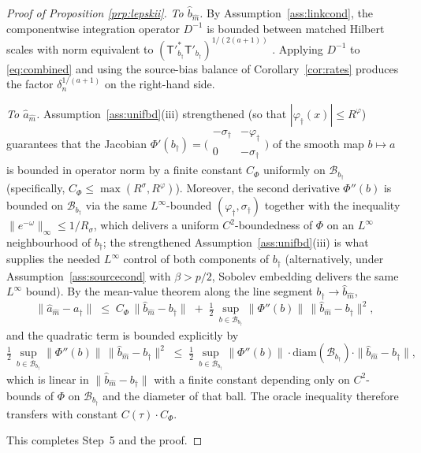 \begin{proof}[Proof of Proposition \ref{prp:lepskii}]
\emph{To $\hat b_{\hat m}$.} By Assumption~\ref{ass:linkcond}, the
componentwise integration operator $D^{-1}$ is bounded between matched
Hilbert scales with norm equivalent to
$(\mathsf{T}'^{*}_{b_\dagger}\mathsf{T}'_{b_\dagger})^{1/(2(a+1))}$
\citep{florens2012}. %
Applying $D^{-1}$ to \eqref{eq:combined} and using the source-bias balance of
Corollary~\ref{cor:rates} produces the factor $\delta_n^{1/(a+1)}$ on the
right-hand side.

\emph{To $\hat a_{\hat m}$.} Assumption~\ref{ass:unifbd}\textup{(iii)}
strengthened (so that $|\varphi_\dagger(x)| \le R^\varphi$) %
guarantees that the Jacobian
\(
\Phi'(b_\dagger) = \bigl(\begin{smallmatrix}-\sigma_\dagger & -\varphi_\dagger \\ 0 & -\sigma_\dagger\end{smallmatrix}\bigr)
\)
of the smooth map $b \mapsto a$ is bounded in operator norm by a finite
constant $C_\Phi$ uniformly on $\mathcal{B}_{b_\dagger}$ (specifically,
$C_\Phi \le \max(R^\sigma, R^\varphi)$). Moreover, the second derivative
$\Phi''(b)$ is bounded on $\mathcal{B}_{b_\dagger}$ via the same
$L^\infty$-bounded $(\varphi_\dagger, \sigma_\dagger)$ together with the
inequality $\|e^{-\omega}\|_\infty \le 1/R_\sigma$, which delivers a uniform
$C^2$-boundedness of $\Phi$ on an $L^\infty$ neighbourhood of $b_\dagger$;
the strengthened Assumption~\ref{ass:unifbd}\textup{(iii)} is what supplies
the needed $L^\infty$ control of both components of $b_\dagger$ (alternatively,
under Assumption~\ref{ass:sourcecond} with $\beta > p/2$, Sobolev embedding
delivers the same $L^\infty$ bound).
By the mean-value theorem along the line segment $b_\dagger \to \hat b_{\hat m}$,
\[
\|\hat a_{\hat m} - a_\dagger\|
\;\le\; C_\Phi\,\|\hat b_{\hat m} - b_\dagger\|
\;+\; \tfrac12\,\sup_{b \in \mathcal{B}_{b_\dagger}}\!\|\Phi''(b)\|\,
\|\hat b_{\hat m} - b_\dagger\|^2,
\]
and the quadratic term is bounded explicitly by
\[
\tfrac12\,\sup_{b \in \mathcal B_{b_\dagger}}\!\|\Phi''(b)\|\,
\|\hat b_{\hat m} - b_\dagger\|^{2}
\;\le\;
\tfrac12\,\sup_{b \in \mathcal B_{b_\dagger}}\!\|\Phi''(b)\|
\cdot \mathrm{diam}(\mathcal B_{b_\dagger})
\cdot \|\hat b_{\hat m} - b_\dagger\|,
\]
which is linear in $\|\hat b_{\hat m} - b_\dagger\|$ with a finite constant
depending only on $C^2$-bounds of $\Phi$ on $\mathcal B_{b_\dagger}$ and the
diameter of that ball. The oracle inequality therefore transfers with
constant $C(\tau)\cdot C_\Phi$.

This completes Step~5 and the proof.
\end{proof}

